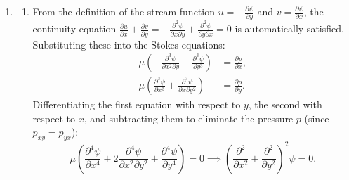 \documentclass{article}
\begin{document}
\begin{enumerate}[label=\fbox{\arabic*}]
\begin{enumerate}[label=(\arabic*)]
          \item When $\varepsilon > 0$, we calculate the rate of change of $H$ along a trajectory:
          \begin{align*}
            \frac{dH}{dt} &= H_x \frac{dx}{dt} + H_y \frac{dy}{dt} = H_x (H_y - \varepsilon H_x H) + H_y (-H_x - \varepsilon H_y H) = -\varepsilon H (H_x^2 + H_y^2).
          \end{align*}
          Inside $D$, we know $H > 0$. Except at the origin (where $H_x = H_y = 0$), $H_x^2 + H_y^2 > 0$.
          Thus, $\frac{dH}{dt} < 0$ everywhere in $D \setminus \{(0, 0)\}$. The Hamiltonian $H(x(t), y(t))$ strictly decreases and is bounded below by 0, so $H(x(t), y(t)) \to 0$ as $t \to \infty$.
          Because $H = 0$ is precisely the boundary $\partial D$, the trajectory approaches the boundary of the square.
          On $\partial D$, $H=0$, meaning the $\varepsilon$-terms vanish, and the vector field matches the Hamiltonian flow, which travels along the edges of the square.
          The four corners of the square, $(\pm 1, 0)$ and $(0, \pm 1)$, are critical points of the vector field (e.g., at $(1, 0)$, $H_x = 0$ and $H_y = 0$). 
          The edges of the square form a heteroclinic cycle connecting these four saddle points.
          As $t \to \infty$, the $\omega$-limit set of the trajectory is this entire heteroclinic cycle $\partial D$.
          Asymptotically, the solution spirals outwards from $(x_0, y_0)$ towards the boundary of the square, spending increasingly longer periods of time near the four corners in succession.
        \end{enumerate}
  \item %
        \begin{enumerate}[label=(\arabic*)]
          \item From the definition of the stream function $u = -\frac{\partial \psi}{\partial y}$ and $v = \frac{\partial \psi}{\partial x}$, the continuity equation $\frac{\partial u}{\partial x} + \frac{\partial v}{\partial y} = -\frac{\partial^2 \psi}{\partial x \partial y} + \frac{\partial^2 \psi}{\partial y \partial x} = 0$ is automatically satisfied. Substituting these into the Stokes equations:
          \begin{align*}
            \mu \left( -\frac{\partial^3 \psi}{\partial x^2 \partial y} - \frac{\partial^3 \psi}{\partial y^3} \right) &= \frac{\partial p}{\partial x}, \\
            \mu \left( \frac{\partial^3 \psi}{\partial x^3} + \frac{\partial^3 \psi}{\partial x \partial y^2} \right) &= \frac{\partial p}{\partial y}.
          \end{align*}
          Differentiating the first equation with respect to $y$, the second with respect to $x$, and subtracting them to eliminate the pressure $p$ (since $p_{xy} = p_{yx}$):
          \[
            \mu \left( \frac{\partial^4 \psi}{\partial x^4} + 2\frac{\partial^4 \psi}{\partial x^2 \partial y^2} + \frac{\partial^4 \psi}{\partial y^4} \right) = 0 \implies \left( \frac{\partial^2}{\partial x^2} + \frac{\partial^2}{\partial y^2} \right)^2 \psi = 0.
          \]
          

\end{enumerate}
\end{enumerate}
\end{document}
